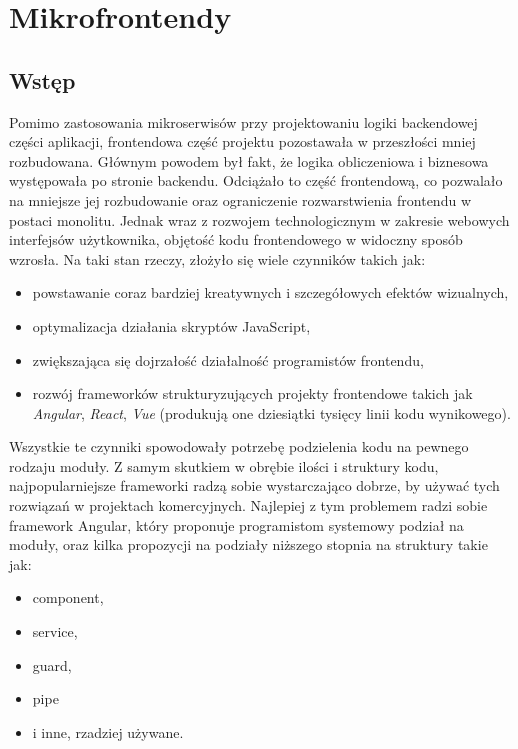\documentclass{SGGW-thesis}
\begin{document}
\chapter{Mikrofrontendy}
  \section{Wstęp}
  Pomimo zastosowania mikroserwisów przy projektowaniu logiki backendowej części aplikacji, frontendowa część projektu pozostawała w przeszłości mniej rozbudowana. Głównym powodem był fakt, że logika obliczeniowa i biznesowa występowała po stronie backendu. Odciążało to część frontendową, co pozwalało na mniejsze jej rozbudowanie oraz ograniczenie rozwarstwienia frontendu w postaci monolitu. Jednak wraz z rozwojem technologicznym w zakresie webowych interfejsów użytkownika, objętość kodu frontendowego w widoczny sposób wzrosła. Na taki stan rzeczy, złożyło się wiele czynników takich jak:
  
  \begin{itemize}
    \item powstawanie coraz bardziej kreatywnych i szczegółowych efektów wizualnych,
    \item optymalizacja działania skryptów JavaScript,
    \item zwiększająca się dojrzałość działalność programistów frontendu,
    \item rozwój frameworków strukturyzujących projekty frontendowe takich jak \textit{Angular}, \textit{React}, \textit{Vue} (produkują one dziesiątki tysięcy linii kodu wynikowego).
  \end{itemize}

  Wszystkie te czynniki spowodowały potrzebę podzielenia kodu na pewnego rodzaju moduły. Z samym skutkiem w obrębie ilości i struktury kodu, najpopularniejsze frameworki radzą sobie wystarczająco dobrze, by używać tych rozwiązań w projektach komercyjnych. Najlepiej z tym problemem radzi sobie framework Angular, który proponuje programistom systemowy podział na moduły, oraz kilka propozycji na podziały niższego stopnia na struktury takie jak:
  
  \begin{itemize}
    \item component,
    \item service,
    \item guard,
    \item pipe
    \item i inne, rzadziej używane.
  \end{itemize}
\end{document}
